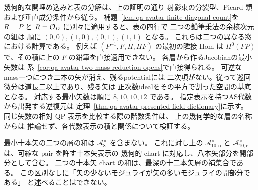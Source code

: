 \begin{remark}[矢数の名称と体上の辞書]
幾何的な開埋め込みと表の分解は、上の証明の通り
射影束の分裂型、Picard 類および垂直成分条件から従う。
補題~\ref{lem:qa-avatar-finite-diagonal-count}を
$R=P$ と $R=\mathcal O_D$ に別々に適用すると、表の四行で
二つの鉛筆乗法の余核次元の組は
順に $(0,0),(1,0),(0,1),(1,1)$ となる。
これらは二つの異なる窓における計算である。
例えば $(P^{-1},F,H,HF)$ の最初の隣接 Hom は
$H^0(FP)$ で、その積に上の $F$ の鉛筆を直接適用できない。
各層から作るJacobianの最小矢数は
系~\ref{cor:qa-avatar-two-mass-reduction-opens}で直接得られる。
可逆なmass一つにつき二本の矢が消え、残るpotentialには
二次項がない。従って巡回微分は道長二以上であり、残る矢は
正次数idealをその平方で割った空間の基底となる。
対応する最小矢数は順に $8,10,10,12$ である。
指定表示を持つAS代数から出発する逆復元は
定理~\ref{thm:qa-avatar-presented-field-dictionary}に示す。
同じ矢数の相対 QP 表示を比較する際の階数条件は、
上の幾何学的な層の名称からは
推論せず、各代数表示の積と関係について検証する。
\end{remark}


\begin{remark}
最小十本矢の二つの層の和は $\mathcal A_8^{\times}$ を含まない。
これに対し上の $\mathcal A_{10,\mathrm o}^{\times}$ と
$\mathcal A_{10,\mathrm e}^{\times}$ は、可縮な pair を許す十本矢表示の
幾何的 chart に対応し、八本矢部分を開部分として含む。
二つの十本矢 chart の和は、最深の十二本矢層の補集合である。
この区別なしに「矢の少ないモジュライが矢の多いモジュライの開部分である」
と述べることはできない。
\end{remark}

